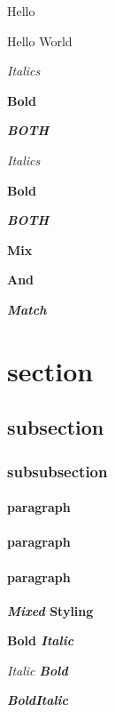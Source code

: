 \documentclass{article}
\begin{document}
    \pagestyle{empty}


Hello

Hello World



\textit{Italics}

\textbf{Bold}

\textit{\textbf{BOTH}}

\textit{Italics}

\textbf{Bold}

\textit{\textbf{BOTH}}

\textbf{Mix}

\textbf{And}

\textit{\textbf{Match}}



\section{section}

\subsection{subsection}

\subsubsection{subsubsection}

\paragraph{paragraph}

\paragraph{paragraph}

\paragraph{paragraph}



\textbf{\textit{Mixed} Styling}

\textbf{Bold \textit{Italic}}

\textit{Italic \textbf{Bold}}

\textit{\textbf{BoldItalic}}
\end{document}
